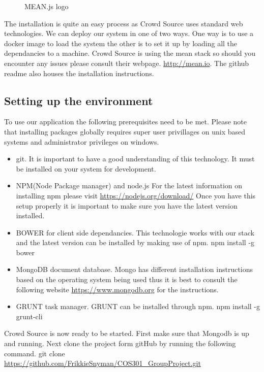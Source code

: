 \begin{figure}[H]
	    	\centering
	    	\caption{MEAN.js logo}
	    	\label{fig:MEAN}
   	\end{figure}
The installation is quite an easy process as Crowd Source uses standard web technologies. We can deploy our system in one of two ways. One way is to use a docker image to load the system the other is to set it up by loading all the dependancies to a machine. Crowd Source is using the mean stack so should you encounter any issues please consult their webpage. \url{http://mean.io}. The github readme also houses the installation instructions.
\subsection{Setting up the environment}
To use our application the following prerequisites need to be met. Please note that installing packages globally requires super user privillages on unix based systems and administrator privileges on windows.
\begin{itemize}
	\item git. It is important to have a good understanding of this technology. It must be installed on your system for development.
	\item NPM(Node Package manager) and node.js
	For the latest information on installing npm please visit \url{https://nodejs.org/download/} Once you have this setup properly it is important to make sure you have the latest version installed.
	\item BOWER for client side dependancies.
	This technologie works with our stack and the latest version can be installed by making use of npm.
	\newline
	npm install -g bower
	\item MongoDB document database. Mongo has different installation instructions based on the operating system being used thus it is best to consult the following website \url{https://www.mongodb.org} for the instructions.
	\item GRUNT task manager. GRUNT can be installed through npm. 
	\newline
	npm install -g grunt-cli
\end{itemize}
Crowd Source is now ready to be started. First make sure that Mongodb is up and running. Next clone the project form gitHub by running the following command.
\newline
git clone \url{https://github.com/FrikkieSnyman/COS301_GroupProject.git}
